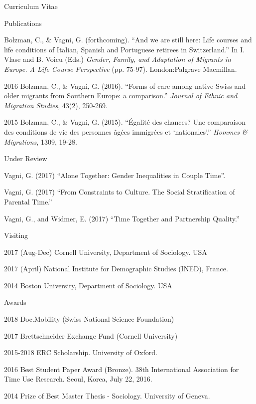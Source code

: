 \documentclass[10pt,a4paper]{article}
\begin{document}
\begin{cv}{Curriculum Vitae}
\begin{cvlist}{Publications}
   	 \item [] Bolzman, C., \& Vagni, G. (forthcoming). ``And we are still here: Life courses and life conditions of Italian, Spanish and Portuguese retirees in Switzerland.'' In I. Vlase and B. Voicu (Eds.) \emph{Gender, Family, and Adaptation of Migrants in Europe. A Life Course Perspective} (pp. 75-97). London:Palgrave Macmillan.

   	\item [2016] Bolzman, C., \& Vagni, G. (2016). ``Forms of care among native Swiss and older migrants from Southern Europe: a comparison.'' \emph{Journal of Ethnic and Migration Studies}, 43(2), 250-269.
   	
   	\item [2015]
   	Bolzman, C., \& Vagni, G. (2015). ``{\'E}galit{\'e} des chances? Une
   	comparaison des conditions de vie des personnes {\^a}g{\'e}es immigr{\'e}es
   	et `nationales'.'' \emph{Hommes \& Migrations}, 1309, 19-28.
   \end{cvlist}
 
 \begin{cvlist}{Under Review}
  
      \item Vagni, G. (2017) ``Alone Together: Gender Inequalities in Couple Time''. 
      \item Vagni, G. (2017)  ``From Constraints to Culture. The Social Stratification of Parental Time.'' 
      \item Vagni, G., and Widmer, E. (2017)  ``Time Together and Partnership Quality.'' 

 \end{cvlist}
 

 \begin{cvlist}{Visiting}
 	\item[2017 (Aug-Dec)] Cornell University, Department of Sociology. USA 
 	\item[2017 (April)] National Institute for Demographic Studies (INED), France. 
 	\item[2014] Boston University, Department of Sociology. USA
 \end{cvlist}
 
 
 \begin{cvlist}{Awards}
 	\item[2018]  Doc.Mobility (Swiss National Science Foundation)
 	\item[2017]  Brettschneider Exchange Fund (Cornell University)
 	\item [2015-2018] ERC Scholarship. University of Oxford. 
 	\item [2016]  Best Student Paper Award (Bronze). 38th International Association for Time Use Research. Seoul, Korea, July 22, 2016. 
 	\item [2014] Prize of Best Master Thesis - Sociology.  University of Geneva. 
 \end{cvlist}
 




\end{cv}
\end{document}
